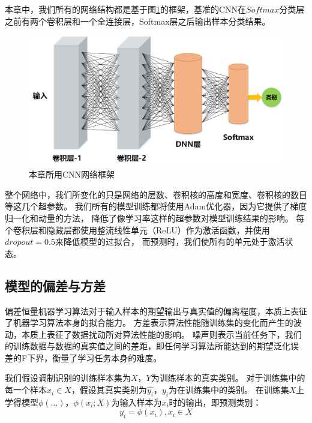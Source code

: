 本章中，我们所有的网络结构都是基于图\ref{fig_5_0}的框架，基准的CNN在$Softmax$分类层之前有两个卷积层和一个全连接层，Softmax层之后输出样本分类结果。\par
\begin{figure}[!htbp]
	\centering
	\includegraphics[scale=0.6]{figures/chapter_5/fig_5_0}
	\caption{本章所用CNN网络框架}
	\label{fig_5_0}
\end{figure}

整个网络中，我们所变化的只是网络的层数、卷积核的高度和宽度、卷积核的数目等这几个超参数。
我们所有的模型训练都将使用Adam优化器，因为它提供了梯度归一化和动量的方法，
降低了像学习率这样的超参数对模型训练结果的影响。
每个卷积层和隐藏层都使用整流线性单元（ReLU）作为激活函数，并使用$dropout=0.5$来降低模型的过拟合，
而预测时，我们使所有的单元处于激活状态。\par

\subsection{模型的偏差与方差}
\label{sec_5_2_1}
偏差恒量机器学习算法对于输入样本的期望输出与真实值的偏离程度，本质上表征了机器学习算法本身的拟合能力。
方差表示算法性能随训练集的变化而产生的波动，本质上表征了数据扰动所对算法性能的影响。
噪声则表示当前任务下，我们的训练数据与数据的真实值之间的差距，即任何学习算法所能达到的期望泛化误
差的F下界，衡量了学习任务本身的难度。\par

我们假设调制识别的训练样本集为$X$，$Y$为训练样本的真实类别。
对于训练集中的每一个样本$x_i \in X$，假设其真实类别为$\hat{y_i}$，$y_i$为在训练集中的类别。
在训练集$X$上学得模型$\phi(\dots)$，$\phi(x_i; X)$为输入样本为$x_i$时的输出，即预测类别：
\begin{equation}
	\label{eqt_5_2}
	y_i = \phi(x_i), x_i \in X
\end{equation}

